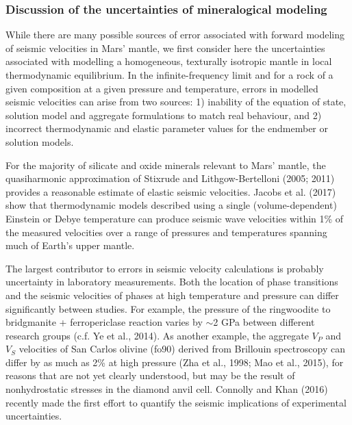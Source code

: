 \subsubsection{Discussion of the uncertainties of mineralogical modeling}
\label{discussionofuncertainties}

While there are many possible sources of error associated with forward modeling of seismic velocities in Mars' mantle, we first consider here the uncertainties associated with modelling a homogeneous, texturally isotropic mantle in local thermodynamic equilibrium.
In the infinite-frequency limit and for a rock of a given composition at a given pressure and temperature, errors in modelled seismic velocities can arise from two sources: 1) inability of the equation of state, solution model and aggregate formulations to match real behaviour, and 2) incorrect thermodynamic and elastic parameter values for the endmember or solution models. 

For the majority of silicate and oxide minerals relevant to Mars' mantle, the quasiharmonic approximation of Stixrude and Lithgow-Bertelloni (2005; 2011) provides a reasonable estimate of elastic seismic velocities. Jacobs et al. (2017) show that thermodynamic models described using a single (volume-dependent) Einstein or Debye temperature can produce seismic wave velocities within 1\% of the measured velocities over a range of pressures and temperatures spanning much of Earth's upper mantle. 

The largest contributor to errors in seismic velocity calculations is probably uncertainty in laboratory measurements. Both the location of phase transitions and the seismic velocities of phases at high temperature and pressure can differ significantly between studies. For example, the pressure of the ringwoodite to bridgmanite + ferropericlase reaction varies by $\sim$2 GPa between different research groups (c.f. Ye et al., 2014). As another example, the aggregate $V_P$ and $V_S$ velocities of San Carlos olivine (fo90) derived from Brillouin spectroscopy can differ by as much as 2\% at high pressure (Zha et al., 1998; Mao et al., 2015), for reasons that are not yet clearly understood, but may be the result of nonhydrostatic stresses in the diamond anvil cell. Connolly and Khan (2016) recently made the first effort to quantify the seismic implications of experimental uncertainties. 

